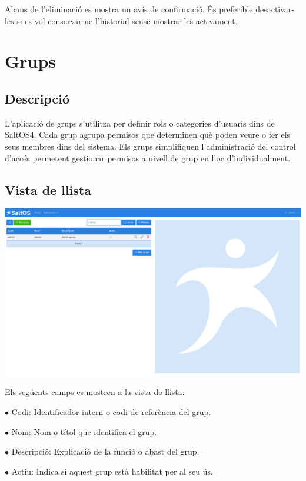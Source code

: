 \documentclass[a4paper]{article}
\begin{document}
Abans de l'eliminació es mostra un avís de confirmació.
És preferible desactivar-les si es vol conservar-ne l'historial sense mostrar-les activament.


\hypertarget{toc176}{}
\section{Grups}

\hypertarget{toc177}{}
\subsection{Descripció}

L'aplicació de grups s'utilitza per definir rols o categories d'usuaris dins de SaltOS4.
Cada grup agrupa permisos que determinen què poden veure o fer els seus membres dins del sistema.
Els grups simplifiquen l'administració del control d'accés permetent gestionar permisos a nivell de grup en lloc d'individualment.

\hypertarget{toc178}{}
\subsection{Vista de llista}

\begin{center}\includegraphics[width=1\textwidth]{../ujest/snaps/test-screenshots-js-screenshots-users-groups-list-ca-es-1-snap.png}\end{center}

Els següents camps es mostren a la vista de llista:

\begin{compactitem}
\item[\color{myblue}$\bullet$] Codi: Identificador intern o codi de referència del grup.
\item[\color{myblue}$\bullet$] Nom: Nom o títol que identifica el grup.
\item[\color{myblue}$\bullet$] Descripció: Explicació de la funció o abast del grup.
\item[\color{myblue}$\bullet$] Actiu: Indica si aquest grup està habilitat per al seu ús.
\end{compactitem}
\end{document}

